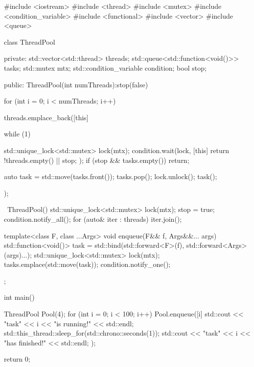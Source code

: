 \begin{tcode}
#include <iostream>
#include <thread>
#include <mutex>
#include <condition_variable>
#include <functional>
#include <vector>
#include <queue>

class ThreadPool
{
private:
    std::vector<std::thread> threads;
    std::queue<std::function<void()>> tasks;
    std::mutex mtx;
    std::condition_variable condition;
    bool stop;

public:
    ThreadPool(int numThreads):stop(false) {
        for (int i = 0; i < numThreads; i++) {
            threads.emplace_back([this] {
                while (1) {
                    std::unique_lock<std::mutex> lock(mtx);
                    condition.wait(lock, [this] {
                        return !threads.empty() || stop;
                    });
                    if (stop && tasks.empty())
                        return;

                    auto task = std::move(tasks.front());
                    tasks.pop();
                    lock.unlock();
                    task();
                }
            });
        }

    }

    ~ThreadPool() {
        {
            std::unique_lock<std::mutex> lock(mtx);
            stop = true;
        }
        condition.notify_all();
        for (auto& iter : threads) {
            iter.join();
        }
    }

    template<class F, class ...Args>
    void enqueue(F&& f, Args&&... args) {
        std::function<void()> task =
                std::bind(std::forward<F>(f), std::forward<Args>(args)...);
        {
            std::unique_lock<std::mutex> lock(mtx);
            tasks.emplace(std::move(task));
        }
        condition.notify_one();
    }

};

int main() {
    ThreadPool Pool(4);
    for (int i = 0; i < 100; i++) {
        Pool.enqueue([i] {
            std::cout << "task" << i << "is running!" << std::endl;
            std::this_thread::sleep_for(std::chrono::seconds(1));
            std::cout << "task" << i << "has finished!" << std::endl;
        });
    }

    return 0;
}
\end{tcode}